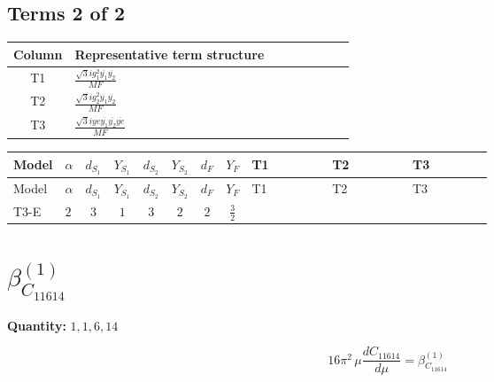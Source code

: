 \documentclass[8pt]{article}
\begin{document}
\begin{landscape}
\subsection*{Terms 2 of 2}
\begin{center}
\begin{tabular}{@{}c >{\raggedright\arraybackslash}p{0.82\linewidth}@{}}
\toprule
Column & Representative term structure \\
\midrule
T1 & \(\displaystyle \frac{\sqrt{3} i g_{1}^{2} \overline{y_{1}} \overline{y_{2}}}{MF}\) \\
\midrule
T2 & \(\displaystyle \frac{\sqrt{3} i g_{2}^{2} \overline{y_{1}} \overline{y_{2}}}{MF}\) \\
\midrule
T3 & \(\displaystyle \frac{\sqrt{3} i ye \overline{y_{1}} \overline{y_{2}} \overline{ye}}{MF}\) \\
\midrule
\bottomrule
\end{tabular}
\end{center}
\smallskip
\tiny
\begin{longtable}{@{}llcccccc >{\raggedright\arraybackslash}p{0.21\linewidth} >{\raggedright\arraybackslash}p{0.21\linewidth} >{\raggedright\arraybackslash}p{0.21\linewidth}@{}}
\toprule
Model & $\alpha$ & $d_{S_1}$ & $Y_{S_1}$ & $d_{S_2}$ & $Y_{S_2}$ & $d_F$ & $Y_F$ & T1 & T2 & T3 \\
\midrule
\endfirsthead
\toprule
Model & $\alpha$ & $d_{S_1}$ & $Y_{S_1}$ & $d_{S_2}$ & $Y_{S_2}$ & $d_F$ & $Y_F$ & T1 & T2 & T3 \\
\midrule
\endhead
T3-E & $2$ & $3$ & $1$ & $3$ & $2$ & $2$ & $\frac{3}{2}$ & \scriptsize\adjustbox{max width=\linewidth}{$\begin{gathered} \frac{9 \sqrt{3} i g_{1}^{2} \overline{y_{1}} \overline{y_{2}}}{8 MF}\end{gathered}$} & \scriptsize\adjustbox{max width=\linewidth}{$\begin{gathered} \frac{11 \sqrt{3} i g_{2}^{2} \overline{y_{1}} \overline{y_{2}}}{8 MF}\end{gathered}$} & \scriptsize\adjustbox{max width=\linewidth}{$\begin{gathered} - \frac{\sqrt{3} i ye \overline{y_{1}} \overline{y_{2}} \overline{ye}}{12 MF}\end{gathered}$} \\
\midrule
\bottomrule
\end{longtable}
\clearpage
\section*{$\beta_{C_{11614}}^{(1)}$}
\noindent\textbf{Quantity: }$\mathrm{1,1,6,14}$\par\smallskip
\[16\pi^2\,\mu\frac{d C_{11614}}{d\mu}=\beta_{C_{11614}}^{(1)}\]

\end{landscape}
\end{document}
